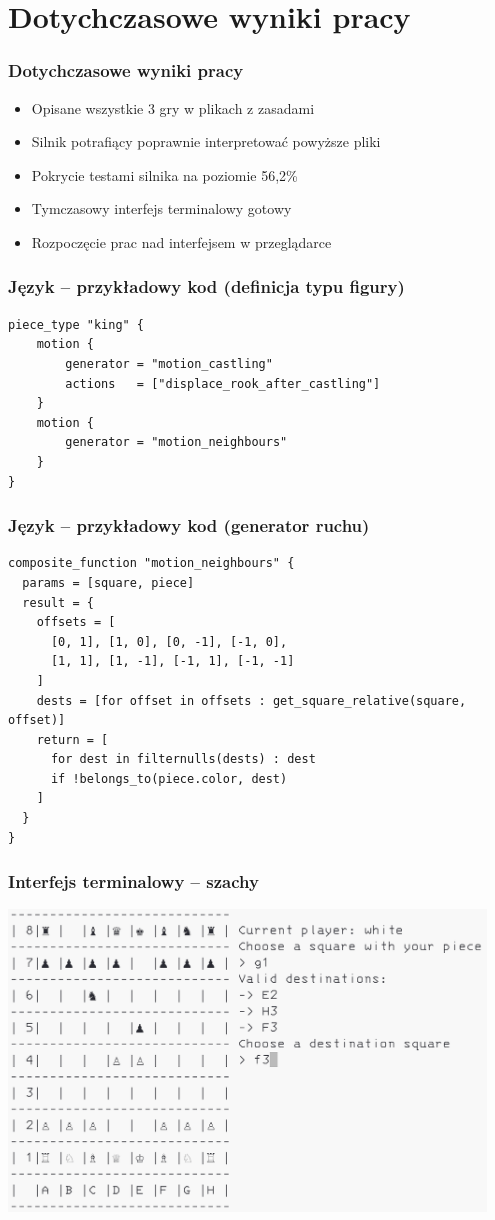 \documentclass{beamer}
\begin{document}
\section{Dotychczasowe wyniki pracy}

\begin{frame}
	\frametitle{Dotychczasowe wyniki pracy}
	\begin{itemize}
		\item Opisane wszystkie 3 gry w plikach z zasadami
		\item Silnik potrafiący poprawnie interpretować powyższe pliki
		\item Pokrycie testami silnika na poziomie 56,2\%
		\item Tymczasowy interfejs terminalowy gotowy
		\item Rozpoczęcie prac nad interfejsem w przeglądarce
	\end{itemize}
\end{frame}

\begin{frame}[fragile]
	\frametitle{Język -- przykładowy kod (definicja typu figury)}

	\begin{lstlisting}
piece_type "king" {
	motion {
		generator = "motion_castling"
		actions   = ["displace_rook_after_castling"]
	}
	motion {
		generator = "motion_neighbours"
	}
}
	\end{lstlisting}
\end{frame}

\begin{frame}[fragile]
	\frametitle{Język -- przykładowy kod (generator ruchu)}

	\begin{lstlisting}
composite_function "motion_neighbours" {
  params = [square, piece]
  result = {
    offsets = [
      [0, 1], [1, 0], [0, -1], [-1, 0],
      [1, 1], [1, -1], [-1, 1], [-1, -1]
    ]
    dests = [for offset in offsets : get_square_relative(square, offset)]
    return = [
      for dest in filternulls(dests) : dest
      if !belongs_to(piece.color, dest)
    ]
  }
}
	\end{lstlisting}
\end{frame}

\begin{frame}
	\frametitle{Interfejs terminalowy -- szachy}
	\centering
	\includegraphics[width=0.95\textwidth]{chess-terminal.png}
\end{frame}
\end{document}
